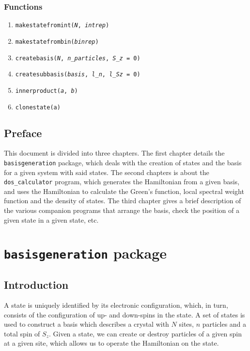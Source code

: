 \documentclass[]{book}
\begin{document}
\subsection*{Functions}

\begin{enumerate}
\item \texttt{makestatefromint(\textit{N}, \textit{intrep})}
\item \texttt{makestatefrombin(\textit{binrep})}
\item \texttt{createbasis(\textit{N}, \textit{n\_particles}, \textit{S\_z} = 0)}
\item \texttt{createsubbasis(\textit{basis}, \textit{l\_n}, \textit{l\_Sz} = 0)}
\item \texttt{innerproduct(\textit{a}, \textit{b})}
\item \texttt{clonestate(a)}
\end{enumerate}

\newpage
\section*{Preface}
This document is divided into three chapters. The first chapter details the \texttt{basisgeneration} package, which deals with the creation of states and the basis for a given system with said states. The second chapters is about the \texttt{dos\_calculator} program, which generates the Hamiltonian from a given basis, and uses the Hamiltonian to calculate the Green's function, local spectral weight function and the density of states. The third chapter gives a brief description of the various companion programs that arrange the basis, check the position of a given state in a given state, etc.

\tableofcontents

\mainmatter

\chapter{\texttt{basisgeneration} package}
\section{Introduction}
A state is uniquely identified by its electronic configuration, which, in turn, consists of the configuration of up- and down-spins in the state. A set of states is used to construct a basis which describes a crystal with $N$ sites, $n$ particles and a total spin of $S_z$. Given a state, we can create or destroy particles of a given spin at a given site, which allows us to operate the Hamiltonian on the state.
\end{document}
